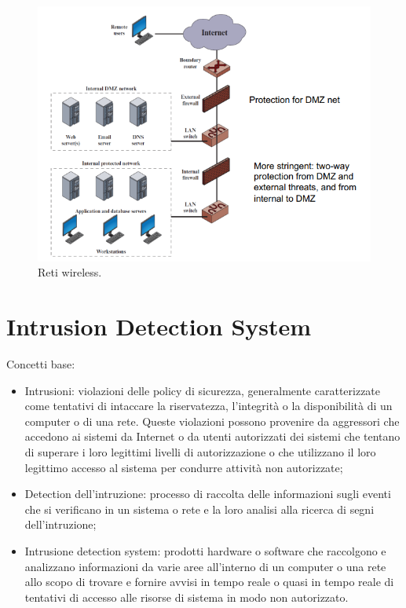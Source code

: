 \begin{figure}[h]
    \centering
    \includegraphics[width=1\textwidth]{images/chapter7/7-6.png}
    \caption{Reti wireless.}
    \label{fig:7-6}
\end{figure}

\section{Intrusion Detection System}

Concetti base:
\begin{itemize}
    \item Intrusioni: violazioni delle policy di sicurezza, generalmente caratterizzate come tentativi di intaccare la riservatezza, l'integrità o la disponibilità di un computer o di una rete. Queste violazioni possono provenire da aggressori che accedono ai sistemi da Internet o da utenti autorizzati dei sistemi che tentano di superare i loro legittimi livelli di autorizzazione o che utilizzano il loro legittimo accesso al sistema per condurre attività non autorizzate;
	\item Detection dell'intruzione: processo di raccolta delle informazioni sugli eventi che si verificano in un sistema o rete e la loro analisi alla ricerca di segni dell'intruzione;
	\item Intrusione detection system: prodotti hardware o software che raccolgono e analizzano informazioni da varie aree all'interno di un computer o una rete allo scopo di trovare e fornire avvisi in tempo reale o quasi in tempo reale di tentativi di accesso alle risorse di sistema in modo non autorizzato.
\end{itemize}

